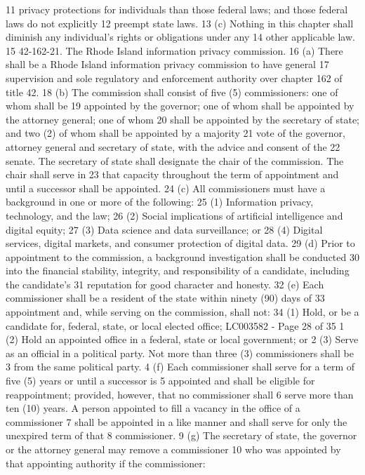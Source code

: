 11 privacy protections for individuals than those federal laws; and those federal laws do not explicitly
12 preempt state laws.
13 (c) Nothing in this chapter shall diminish any individual's rights or obligations under any
14 other applicable law.
15 42-162-21. The Rhode Island information privacy commission.
16 (a) There shall be a Rhode Island information privacy commission to have general
17 supervision and sole regulatory and enforcement authority over chapter 162 of title 42.
18 (b) The commission shall consist of five (5) commissioners: one of whom shall be
19 appointed by the governor; one of whom shall be appointed by the attorney general; one of whom
20 shall be appointed by the secretary of state; and two (2) of whom shall be appointed by a majority
21 vote of the governor, attorney general and secretary of state, with the advice and consent of the
22 senate. The secretary of state shall designate the chair of the commission. The chair shall serve in
23 that capacity throughout the term of appointment and until a successor shall be appointed.
24 (c) All commissioners must have a background in one or more of the following:
25 (1) Information privacy, technology, and the law;
26 (2) Social implications of artificial intelligence and digital equity;
27 (3) Data science and data surveillance; or
28 (4) Digital services, digital markets, and consumer protection of digital data.
29 (d) Prior to appointment to the commission, a background investigation shall be conducted
30 into the financial stability, integrity, and responsibility of a candidate, including the candidate’s
31 reputation for good character and honesty.
32 (e) Each commissioner shall be a resident of the state within ninety (90) days of
33 appointment and, while serving on the commission, shall not:
34 (1) Hold, or be a candidate for, federal, state, or local elected office; 
LC003582 - Page 28 of 35
1 (2) Hold an appointed office in a federal, state or local government; or
2 (3) Serve as an official in a political party. Not more than three (3) commissioners shall be
3 from the same political party.
4 (f) Each commissioner shall serve for a term of five (5) years or until a successor is
5 appointed and shall be eligible for reappointment; provided, however, that no commissioner shall
6 serve more than ten (10) years. A person appointed to fill a vacancy in the office of a commissioner
7 shall be appointed in a like manner and shall serve for only the unexpired term of that
8 commissioner.
9 (g) The secretary of state, the governor or the attorney general may remove a commissioner
10 who was appointed by that appointing authority if the commissioner:
